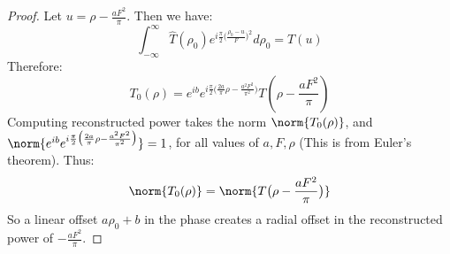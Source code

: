 \begin{proof}
            Let $u = \rho - \frac{aF^2}{\pi}$. Then we have:
            \begin{equation*}
            \int_{-\infty}^{\infty} \hat{T}(\rho_0)e^{i\frac{\pi}{2}\big(\frac{\rho_0 - u}{F}\big)^2}d\rho_0 = T(u)
            \end{equation*}
            Therefore:
            \begin{equation*}
            T_0(\rho) = e^{ib}e^{i\frac{\pi}{2}\big(\frac{2a}{\pi}\rho - \frac{a^2F^2}{\pi^2}\big)}T(\rho - \frac{aF^2}{\pi})
            \end{equation*}
            Computing reconstructed power takes the norm $\norm{T_{0}(\rho)}$, and $\norm{e^{ib}e^{i\frac{\pi}{2}\big(\frac{2a}{\pi}\rho - \frac{a^2F^2}{\pi^2}\big)}} = 1$, for all values of $a,F, \rho$ (This is from Euler's theorem). Thus:
            \begin{equation*}
                \norm{T_{0}(\rho)} = \norm{T\big(\rho - \frac{aF^2}{\pi}\big)}    
            \end{equation*}
            So a linear offset $a\rho_0+b$ in the phase creates a radial offset in the reconstructed power of $-\frac{aF^2}{\pi}$.
            \end{proof}
